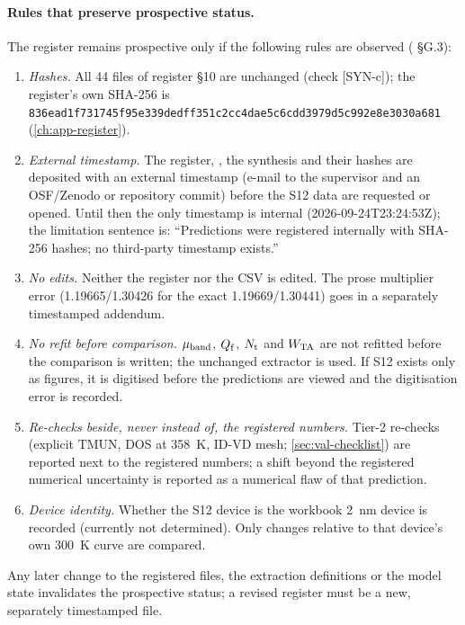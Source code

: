 \paragraph{Rules that preserve prospective status.} The register remains prospective only if the following rules are observed ( \S G.3):
\begin{enumerate}
  \item \emph{Hashes.} All 44 files of register \S 10 are unchanged (check [SYN-c]); the register's own SHA-256 is \texttt{836ead1f731745f95e339dedff351c2cc4dae5c6cdd3979d5c992e8e3030a681} (\cref{ch:app-register}).
  \item \emph{External timestamp.} The register, , the synthesis and their hashes are deposited with an external timestamp (e-mail to the supervisor and an OSF/Zenodo or repository commit) before the S12 data are requested or opened. Until then the only timestamp is internal (2026-09-24T23:24:53Z); the limitation sentence is: ``Predictions were registered internally with SHA-256 hashes; no third-party timestamp exists.''
  \item \emph{No edits.} Neither the register nor the CSV is edited. The prose multiplier error (1.19665/1.30426 for the exact 1.19669/1.30441) goes in a separately timestamped addendum.
  \item \emph{No refit before comparison.} $\mu_{\mathrm{band}}$, $Q_{\mathrm{f}}$, $N_{\mathrm{t}}$ and $W_{\mathrm{TA}}$ are not refitted before the comparison is written; the unchanged extractor is used. If S12 exists only as figures, it is digitised before the predictions are viewed and the digitisation error is recorded.
  \item \emph{Re-checks beside, never instead of, the registered numbers.} Tier-2 re-checks (explicit TMUN, DOS at 358~K, ID-VD mesh; \cref{sec:val-checklist}) are reported next to the registered numbers; a shift beyond the registered numerical uncertainty is reported as a numerical flaw of that prediction.
  \item \emph{Device identity.} Whether the S12 device is the workbook 2~nm device is recorded (currently not determined). Only changes relative to that device's own 300~K curve are compared.
\end{enumerate}
Any later change to the registered files, the extraction definitions or the model state invalidates the prospective status; a revised register must be a new, separately timestamped file.

